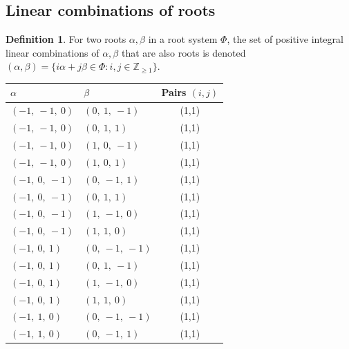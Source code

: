 \documentclass[11pt]{article}
\newcommand{\noi}{\noindent}
\theoremstyle{definition}
\newtheorem{definition}{Definition}[section]
\newif\ifsummablepairs
\begin{document}
\ifsummablepairs
\subsection{Linear combinations of roots}

\begin{definition}
For two roots $\alpha, \beta$ in a root system $\Phi$, the set of positive integral linear combinations of $\alpha, \beta$ that are also roots is denoted
\(
	(\alpha, \beta) = \{ i \alpha + j \beta \in \Phi : i, j \in \mathbb{Z}_{\ge 1} \}
\).
\end{definition}
\noi \noindent \begin{longtable}{|l|l|c|}
    \hline
    $\alpha$ & $\beta$ & Pairs $(i,j)$ \\
    \hline
    \endhead
    $\left( -1, \  -1, \  0\right)$ & $\left( 0, \  1, \  -1\right)$ & (1,1) \\
    \hline
    $\left( -1, \  -1, \  0\right)$ & $\left( 0, \  1, \  1\right)$ & (1,1) \\
    \hline
    $\left( -1, \  -1, \  0\right)$ & $\left( 1, \  0, \  -1\right)$ & (1,1) \\
    \hline
    $\left( -1, \  -1, \  0\right)$ & $\left( 1, \  0, \  1\right)$ & (1,1) \\
    \hline
    $\left( -1, \  0, \  -1\right)$ & $\left( 0, \  -1, \  1\right)$ & (1,1) \\
    \hline
    $\left( -1, \  0, \  -1\right)$ & $\left( 0, \  1, \  1\right)$ & (1,1) \\
    \hline
    $\left( -1, \  0, \  -1\right)$ & $\left( 1, \  -1, \  0\right)$ & (1,1) \\
    \hline
    $\left( -1, \  0, \  -1\right)$ & $\left( 1, \  1, \  0\right)$ & (1,1) \\
    \hline
    $\left( -1, \  0, \  1\right)$ & $\left( 0, \  -1, \  -1\right)$ & (1,1) \\
    \hline
    $\left( -1, \  0, \  1\right)$ & $\left( 0, \  1, \  -1\right)$ & (1,1) \\
    \hline
    $\left( -1, \  0, \  1\right)$ & $\left( 1, \  -1, \  0\right)$ & (1,1) \\
    \hline
    $\left( -1, \  0, \  1\right)$ & $\left( 1, \  1, \  0\right)$ & (1,1) \\
    \hline
    $\left( -1, \  1, \  0\right)$ & $\left( 0, \  -1, \  -1\right)$ & (1,1) \\
    \hline
    $\left( -1, \  1, \  0\right)$ & $\left( 0, \  -1, \  1\right)$ & (1,1) \\

\end{longtable}
\end{document}
